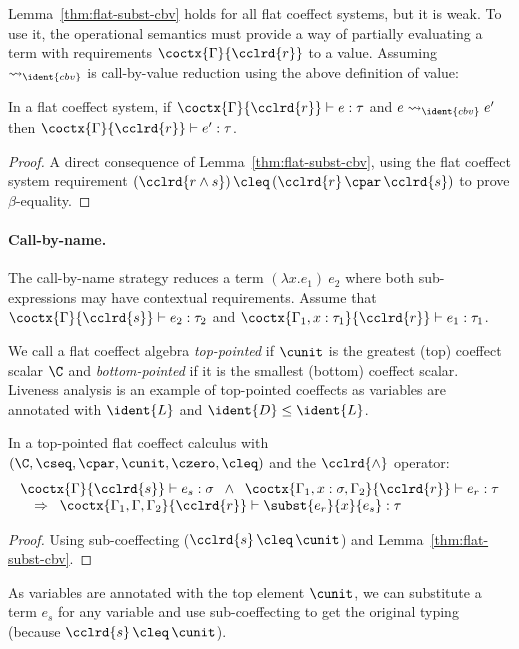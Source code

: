 \noindent
Lemma~\ref{thm:flat-subst-cbv} holds for all flat coeffect systems, but it is weak. To use it, 
the operational semantics must provide a way of partially evaluating a term 
with requirements $\coctx{\Gamma}{\cclrd{r}}$ to a value.
Assuming $\reduce_{\ident{cbv}}$ is call-by-value reduction using the above definition of value:

\begin{theorem}
In a flat coeffect system, if $\coctx{\Gamma}{\cclrd{r}} \vdash e : \tau$ 
and $e \reduce_{\ident{cbv}} e'$ then $\coctx{\Gamma}{\cclrd{r}} \vdash e' : \tau$.
\end{theorem}
\begin{proof}
A direct consequence of Lemma~\ref{thm:flat-subst-cbv}, using the flat coeffect system requirement
$(\cclrd{r \wedge s}) \,\cleq\, (\cclrd{r}\,\cpar\,\cclrd{s})$ to prove $\beta$-equality.
\end{proof}

\paragraph{Call-by-name.}
The call-by-name strategy reduces a term $(\lambda x. e_1)~e_2$ where both sub-expressions 
may have contextual requirements. Assume that $\coctx{\Gamma}{\cclrd{s}} \vdash e_2 : \tau_2$ and
$\coctx{\Gamma_1, x :\tau_1}{\cclrd{r}} \vdash e_1 : \tau_1$. 

%

We call a flat coeffect algebra \emph{top-pointed} if $\cunit$ is the greatest (top) coeffect scalar
$\C$ and \emph{bottom-pointed} if it is the smallest (bottom) coeffect scalar.
Liveness analysis is an example of top-pointed coeffects
as variables are annotated with $\ident{L}$ and $\ident{D} \leq \ident{L}$. 

\begin{lemma}
\label{thm:cbn-substitution-top}
In a top-pointed flat coeffect calculus with $(\C, \cseq, \cpar, \cunit, \czero, \cleq)$ 
and the $\cclrd{\wedge}$ operator:
\[
\begin{array}{l}
\coctx{\Gamma}{\cclrd{s}} \vdash e_s : \sigma \;\; \wedge \;\; \coctx{\Gamma_1,  x : \sigma, \Gamma_2}{ \cclrd{r}  } \vdash e_r : \tau\\
\quad \Rightarrow \;\; \coctx{\Gamma_1,\Gamma,\Gamma_2}{ \cclrd{r} } \vdash \subst{e_r}{x}{e_s} : \tau
\end{array}
\]
\vspace{-1.5em}
\end{lemma}
\begin{proof}
Using sub-coeffecting ($\cclrd{s} \,\cleq\, \cunit$) and Lemma~\ref{thm:flat-subst-cbv}.
\end{proof}
%
\noindent
As variables are annotated with the top element $\cunit$, we can substitute a term $e_s$ for any variable and 
use sub-coeffecting to get the original typing (because $\cclrd{s} \,\cleq\, \cunit$). 

